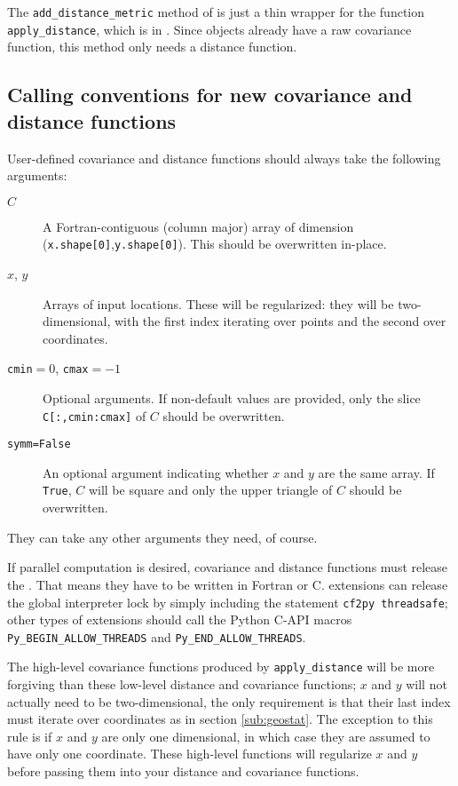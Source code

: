 \documentclass[]{manual}
\begin{document}
The \texttt{add_distance_metric} method of  is just a thin wrapper for the function \texttt{apply_distance}, which is in . Since  objects already have a raw covariance function, this method only needs a distance function. 



\subsection{Calling conventions for new covariance and distance functions}
\label{sub:user_ccs}

User-defined covariance and distance functions should always take the following arguments:
\begin{description}
	\item[$C$] A Fortran-contiguous (column major) array of dimension (\texttt{x.shape[0]},\texttt{y.shape[0]}). This should be overwritten in-place.
	\item[$x$, $y$] Arrays of input locations. These will be regularized: they will be two-dimensional, with the first index iterating over points and the second over coordinates.
	\item[\texttt{cmin}$=0$, \texttt{cmax}$=-1$] Optional arguments. If non-default values are provided, only the slice \texttt{C[:,cmin:cmax]} of $C$ should be overwritten.
	\item[\texttt{symm=False}] An optional argument indicating whether $x$ and $y$ are the same array. If \texttt{True}, $C$ will be square and only the upper triangle of $C$ should be overwritten. 
\end{description}
They can take any other arguments they need, of course. 

If parallel computation is desired, covariance and distance functions must release the . That means they have to be written in Fortran or C.  extensions can release the global interpreter lock by simply including the statement \texttt{cf2py threadsafe}; other types of extensions should call the Python C-API macros \texttt{Py_BEGIN_ALLOW_THREADS} and \texttt{Py_END_ALLOW_THREADS}.

The high-level covariance functions produced by \texttt{apply_distance} will be more forgiving than these low-level distance and covariance functions; $x$ and $y$ will not actually need to be two-dimensional, the only requirement is that their last index must iterate over coordinates as in section \ref{sub:geostat}. The exception to this rule is if $x$ and $y$ are only one dimensional, in which case they are assumed to have only one coordinate. These high-level functions will regularize $x$ and $y$ before passing them into your distance and covariance functions.
\end{document}

